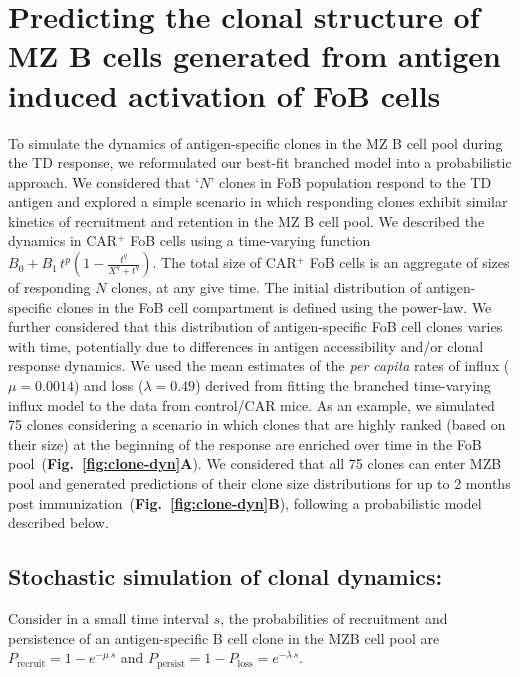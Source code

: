 \documentclass[11pt]{article}
\begin{document}
\clearpage



\section*{Predicting the clonal structure of MZ B cells generated from antigen induced activation of FoB cells}

To simulate the dynamics of antigen-specific clones in the MZ B cell pool during the TD response, we reformulated our best-fit branched model into a probabilistic approach.
We considered that `$N$' clones in FoB population respond to the TD antigen and explored a simple scenario in which responding clones exhibit similar kinetics of recruitment and retention in the MZ B cell pool.
We described the dynamics in CAR$^{+}$ FoB cells using a time-varying function $B_0 + B_1 \, t^p  (1 - \frac{t^q}{X^q + t^q})$. %
The total size of CAR$^{+}$ FoB cells is an aggregate of sizes of responding $N$ clones, at any give time.
The initial distribution of antigen-specific clones in the FoB cell compartment is defined using the power-law.
We further considered that this distribution of antigen-specific FoB cell clones varies with time, potentially due to differences in antigen accessibility and/or clonal response dynamics. 
We used the mean estimates of the \textit{per capita} rates of influx ($\mu = 0.0014$) and loss ($\lambda = 0.49$) derived from fitting the branched time-varying influx model to the data from control/CAR mice.
As an example, we simulated 75 clones considering a scenario in which clones that are highly ranked (based on their size) at the beginning of the response are enriched over time in the FoB pool~(\textbf{Fig.~\ref{fig:clone-dyn}A}).
We considered that all 75 clones can enter MZB pool and generated predictions of their clone size distributions for up to 2 months post immunization~(\textbf{Fig.~\ref{fig:clone-dyn}B}), following a probabilistic model described below.

 
\subsection*{Stochastic simulation of clonal dynamics:} 
Consider in a small time interval $s$, the probabilities of recruitment and persistence of an antigen-specific B cell clone in the MZB cell pool are $P_\text{recruit} = 1-e^{-\mu \, s} $  and $P_\text{persist} = 1 - P_\text{loss} =  e^{-\lambda \, s} $.
\end{document}
